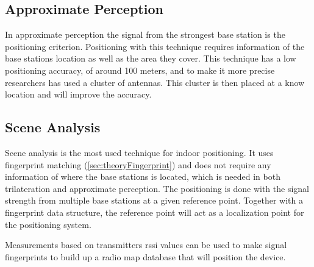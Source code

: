 \subsection{Approximate Perception}\label{sec:theoryRssiApproxPerception}
In approximate perception the signal from the strongest base station is the positioning criterion.
Positioning with this technique requires information of the base stations location as well as the area they cover. 
This technique has a low positioning accuracy, of around 100 meters, and to make it more precise researchers has used a cluster of antennas.
This cluster is then placed at a know location and will improve the accuracy.
\cite{IndoorFingerprintPositioning2017} 

\subsection{Scene Analysis}\label{sec:theoryRssiSceneAnalysis}
Scene analysis is the most used technique for indoor positioning.
It uses fingerprint matching (\cref{sec:theoryFingerprint}) and does not require any information of where the base stations is located, which is needed in both trilateration and approximate perception.
The positioning is done with the signal strength from multiple base stations at a given reference point.
Together with a fingerprint data structure, the reference point will act as a localization point for the positioning system.\cite{IndoorFingerprintPositioning2017} 

\bigskip

Measurements based on transmitters \acrshort{rssi} values can be used to make signal fingerprints to build up a radio map database that will position the device.\cite{DevelopmentMobileIndoor2017} 
